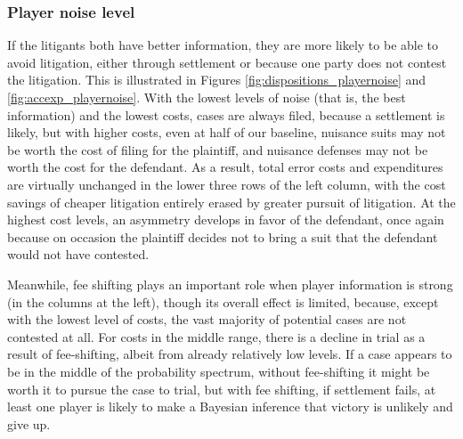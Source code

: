 \documentclass{article}
\begin{document}
\subsubsection{Player noise level}

If the litigants both have better information, they are more likely to be able to avoid litigation, either through settlement or because one party does not contest the litigation. This is illustrated in Figures \ref{fig:dispositions_playernoise} and \ref{fig:accexp_playernoise}. With the lowest levels of noise (that is, the best information) and the lowest costs, cases are always filed, because a settlement is likely, but with higher costs, even at half of our baseline, nuisance suits may not be worth the cost of filing for the plaintiff, and nuisance defenses may not be worth the cost for the defendant. As a result, total error costs and expenditures are virtually unchanged in the lower three rows of the left column, with the cost savings of cheaper litigation entirely erased by greater pursuit of litigation. At the highest cost levels, an asymmetry develops in favor of the defendant, once again because on occasion the plaintiff decides not to bring a suit that the defendant would not have contested. 

Meanwhile, fee shifting plays an important role when player information is strong (in the columns at the left), though its overall effect is limited, because, except with the lowest level of costs, the vast majority of potential cases are not contested at all. For costs in the middle range, there is a decline in trial as a result of fee-shifting, albeit from already relatively low levels. If a case appears to be in the middle of the probability spectrum, without fee-shifting it might be worth it to pursue the case to trial, but with fee shifting, if settlement fails, at least one player is likely to make a Bayesian inference that victory is unlikely and give up. 
\end{document}
